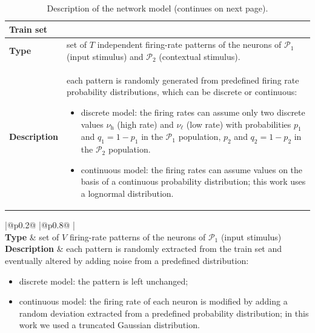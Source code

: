 \documentclass[a4paper, 12pt, twoside, openright]{book}
\newcommand{\popI}{\mathcal{P}_1}
\newcommand{\popII}{\mathcal{P}_2}
\newcommand{\rh}{\nu_\text{h}}
\newcommand{\rl}{\nu_{\ell}}
\def\marg{2pt}
\begin{document}
\begin{table}[H]
\begin{tabular}{
  |@{\hspace*{\marg}}p{}@{\hspace*{\marg}}
  |@{\hspace*{\marg}}p{}@{\hspace*{\marg}}
  |}
{  \textbf{Train set}
  }\\
\hline 
\textbf{Type} & set of $T$ independent firing-rate patterns of the neurons of $\popI$ (input stimulus) and $\popII$ (contextual stimulus). \\
\hline 
  \textbf{Description} &
  each pattern is randomly generated from predefined firing rate probability distributions, which can be discrete or continuous:
    \begin{itemize}
    \item discrete model: the firing rates can assume only two discrete values $\rh$ (high rate) and $\rl$ (low rate) with probabilities $p_1$ and $q_1 = 1 - p_1$ in the $\popI$ population, $p_2$ and $q_2 = 1 - p_2$ in the $\popII$ population.  
    \item continuous model: the firing rates can assume values on the basis of a continuous probability distribution; this work uses a lognormal distribution.
    \end{itemize}\\
\hline
\end{tabular}
\caption{Description of the network model (continues on next page).}
\end{table}
\addtocounter{table}{-1}
\begin{table}[H]
\begin{tabular}{
  |@{\hspace*{\marg}}p{}@{\hspace*{\marg}}
  |@{\hspace*{\marg}}p{}@{\hspace*{\marg}}
  |}
  \hline 
  \\
\hline 
\textbf{Type} & set of $V$ firing-rate patterns of the neurons of $\popI$ (input stimulus) \\
\hline 
  \textbf{Description} &
  each pattern is randomly extracted from the train set and eventually altered by adding noise from a predefined distribution:
    \begin{itemize}
    \item discrete model: the pattern is left unchanged;
    \item continuous model: the firing rate of each neuron is modified by adding a random deviation extracted from a predefined probability distribution; in this work we used a truncated Gaussian distribution. 
    \end{itemize}\\
\hline
\end{tabular}
\caption{Description of the network model (continues on next page).}
\end{table}
\end{document}
